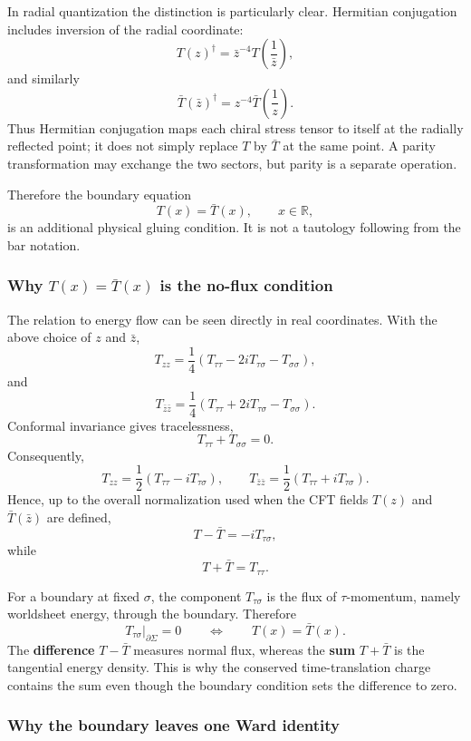 \documentclass[
  10pt,
  a4paper,
  openany]{book}
\begin{document}
In radial quantization the distinction is particularly clear. Hermitian
conjugation includes inversion of the radial coordinate: \[
T(z)^\dagger
=\bar z^{-4}T\left(\frac{1}{\bar z}\right),
\] and similarly \[
\bar T(\bar z)^\dagger
=z^{-4}\bar T\left(\frac{1}{z}\right).
\] Thus Hermitian conjugation maps each chiral stress tensor to itself
at the radially reflected point; it does not simply replace \(T\) by
\(\bar T\) at the same point. A parity transformation may exchange the
two sectors, but parity is a separate operation.

Therefore the boundary equation \[
T(x)=\bar T(x),
\qquad x\in\mathbb R,
\] is an additional physical gluing condition. It is not a tautology
following from the bar notation.

\subsubsection{\texorpdfstring{Why \(T(x)=\bar T(x)\) is the no-flux
condition}{Why T(x)=\textbackslash bar T(x) is the no-flux condition}}\label{why-txbar-tx-is-the-no-flux-condition}

The relation to energy flow can be seen directly in real coordinates.
With the above choice of \(z\) and \(\bar z\), \[
T_{zz}
=\frac14
\left(
T_{\tau\tau}
-2iT_{\tau\sigma}
-T_{\sigma\sigma}
\right),
\] and \[
T_{\bar z\bar z}
=\frac14
\left(
T_{\tau\tau}
+2iT_{\tau\sigma}
-T_{\sigma\sigma}
\right).
\] Conformal invariance gives tracelessness, \[
T_{\tau\tau}+T_{\sigma\sigma}=0.
\] Consequently, \[
T_{zz}
=\frac12
\left(
T_{\tau\tau}-iT_{\tau\sigma}
\right),
\qquad
T_{\bar z\bar z}
=\frac12
\left(
T_{\tau\tau}+iT_{\tau\sigma}
\right).
\] Hence, up to the overall normalization used when the CFT fields
\(T(z)\) and \(\bar T(\bar z)\) are defined, \[
T-\bar T
=-iT_{\tau\sigma},
\] while \[
T+\bar T
=T_{\tau\tau}.
\]

For a boundary at fixed \(\sigma\), the component \(T_{\tau\sigma}\) is
the flux of \(\tau\)-momentum, namely worldsheet energy, through the
boundary. Therefore \[
T_{\tau\sigma}\big|_{\partial\Sigma}=0
\qquad\Longleftrightarrow\qquad
T(x)=\bar T(x).
\] The \textbf{difference} \(T-\bar T\) measures normal flux, whereas
the \textbf{sum} \(T+\bar T\) is the tangential energy density. This is
why the conserved time-translation charge contains the sum even though
the boundary condition sets the difference to zero.

\subsubsection{Why the boundary leaves one Ward
identity}\label{why-the-boundary-leaves-one-ward-identity}
\end{document}
